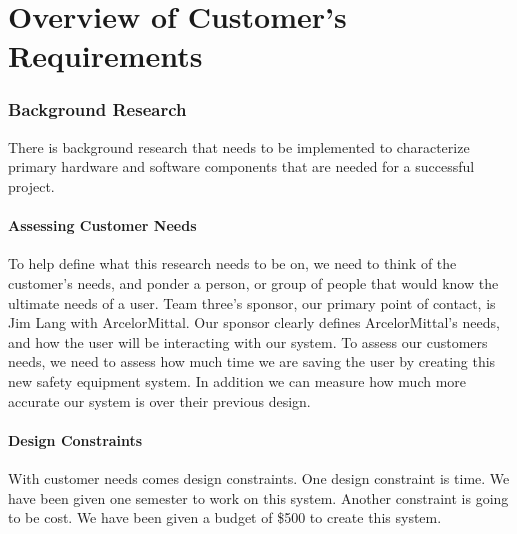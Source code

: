\documentclass[Letter,11pt]{article}
\begin{document}
	
			\tableofcontents
			\listoffigures
			\begingroup
			\let\clearpage\relax
			\listoftables
			\endgroup
			\newpage
	

\part{Overview of Customer's Requirements}
\section{Background Research}\label{research}
	There is background research that needs to be implemented to characterize primary hardware and software components that are needed for a successful project. \\
	\subsection{Assessing Customer Needs}\label{custneeds}
	To help define what this research needs to be on, we need to think of the customer's needs, and ponder a person, or group of people that would know the ultimate needs of a user. Team three's sponsor, our primary point of contact, is Jim Lang with ArcelorMittal. Our sponsor clearly defines ArcelorMittal's needs, and how the user will be interacting with our system. To assess our customers needs, we need to assess how much time we are saving the user by creating this new safety equipment system. In addition we can measure how much more accurate our system is over their previous design. \\ 
	\subsection{Design Constraints}
	With customer needs comes design constraints. One design constraint is time. We have been given one semester to work on this system. Another constraint is going to be cost. We have been given a budget of \$500 to create this system.\\ 
\end{document}
